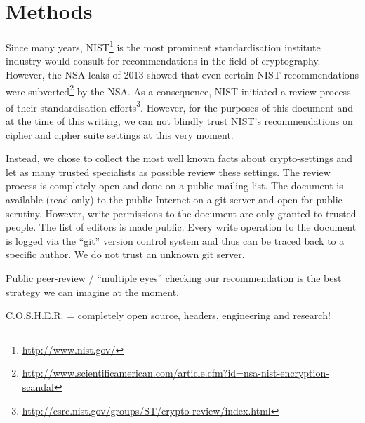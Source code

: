 \section{Methods}

Since many years, NIST\footnote{\url{http://www.nist.gov/}} is the most
prominent standardisation institute industry would consult for recommendations
in the field of cryptography. However, the NSA leaks of 2013 showed that even
certain NIST recommendations were
subverted\footnote{\url{http://www.scientificamerican.com/article.cfm?id=nsa-nist-encryption-scandal}}
by the NSA.  As a consequence, NIST initiated a review process of their
standardisation
efforts\footnote{\url{http://csrc.nist.gov/groups/ST/crypto-review/index.html}}.
However, for the purposes of this document and at the time of this writing, we
can not blindly trust NIST's recommendations on cipher and cipher suite
settings at this very moment. 

Instead, we chose to collect the most well known facts about crypto-settings
and let as many trusted specialists as possible review these settings.  The
review process is completely open and done on a public mailing list. The
document is available (read-only) to the public Internet on a git server and
open for public scrutiny. However, write permissions to the document are only
granted to trusted people. The list of editors is made public.  Every write
operation to the document is logged via the ``git'' version control system and
thus can be traced back to a specific author.  We do not trust an unknown git
server. 

Public peer-review / ``multiple eyes'' checking our recommendation is the best
strategy we can imagine at the moment.


C.O.S.H.E.R. = completely open source, headers, engineering and research!

